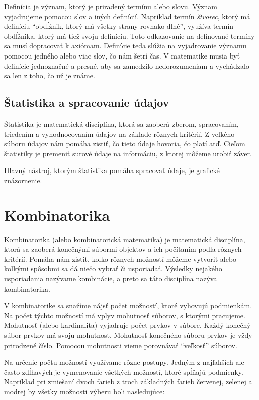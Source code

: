 \documentclass{report}
\begin{document}
Definícia je význam, ktorý je priradený termínu alebo slovu. Význam vyjadrujeme pomocou slov a iných definícií. Napríklad termín \emph{štvorec}, ktorý má definíciu \enquote{obdĺžnik, ktorý má všetky strany rovnako dlhé}, využíva termín obdĺžnika, ktorý má tiež svoju definíciu. Toto odkazovanie na definované termíny sa musí dopracovať k axiómam. Definície teda slúžia na vyjadrovanie významu pomocou jedného alebo viac slov, čo nám šetrí čas. V matematike musia byť definície jednoznačné a presné, aby sa zamedzilo nedorozumeniam a vychádzalo sa len z toho, čo už je známe.

\section{Štatistika a spracovanie údajov}

Štatistika je matematická disciplína, ktorá sa zaoberá zberom, spracovaním, triedením a vyhodnocovaním údajov na základe rôznych kritérií. Z veľkého súboru údajov nám pomáha zistiť, čo tieto údaje hovoria, čo platí atď. Cieľom štatistiky je premeniť surové údaje na informáciu, z ktorej môžeme urobiť záver.

Hlavný nástroj, ktorým štatistika pomáha spracovať údaje, je grafické znázornenie. 

\chapter{Kombinatorika}

Kombinatorika (alebo kombinatorická matematika) je matematická disciplína, ktorá sa zaoberá konečnými súbormi objektov a ich počítaním podľa rôznych kritérií. Pomáha nám zistiť, koľko rôznych možností môžeme vytvoriť alebo koľkými spôsobmi sa dá niečo vybrať či usporiadať. Výsledky nejakého usporiadania nazývame kombinácie, a preto sa táto disciplína nazýva kombinatorika.

V kombinatorike sa snažíme nájsť počet možností, ktoré vyhovujú podmienkám. Na počet týchto možností má vplyv mohutnosť súborov, s ktorými pracujeme. Mohutnosť (alebo kardinalita) vyjadruje počet prvkov v súbore. Každý konečný súbor prvkov má svoju mohutnosť. Mohutnosť konečného súboru prvkov je vždy prirodzené číslo. Pomocou mohutnosti vieme porovnávať \enquote{veľkosť} súborov.

Na určenie počtu možností využívame rôzne postupy. Jedným z najľahších ale často zdĺhavých je vymenovanie všetkých možností, ktoré spĺňajú podmienky. Napríklad pri zmiešaní dvoch farieb z troch základných farieb červenej, zelenej a modrej by všetky možnosti výberu boli nasledujúce:
\end{document}
